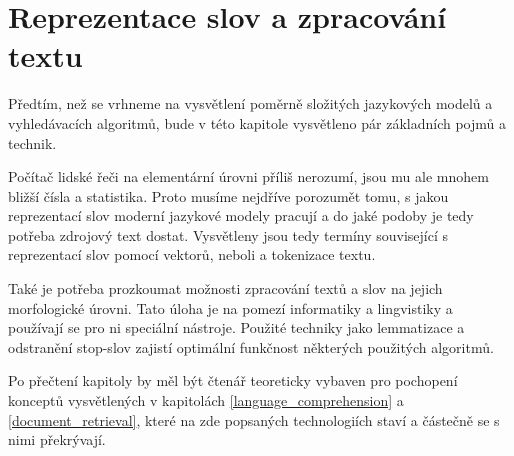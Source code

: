
\chapter{Reprezentace slov a zpracování textu}
\label{text_processing}

Předtím, než se vrhneme na vysvětlení poměrně složitých jazykových modelů a vyhledávacích algoritmů, bude v této kapitole vysvětleno pár základních pojmů a technik.\par 
Počítač lidské řeči na elementární úrovni příliš nerozumí, jsou mu ale mnohem bližší čísla a statistika. Proto musíme nejdříve porozumět tomu, s jakou reprezentací slov moderní jazykové modely pracují a do jaké podoby je tedy potřeba zdrojový text dostat. Vysvětleny jsou tedy termíny související s reprezentací slov pomocí vektorů, neboli  a tokenizace textu.\par 
Také je potřeba prozkoumat možnosti zpracování textů a slov na jejich morfologické úrovni. Tato úloha je na pomezí informatiky a lingvistiky a používají se pro ni speciální nástroje. Použité techniky jako lemmatizace a odstranění stop-slov zajistí optimální funkčnost některých použitých algoritmů.\par
Po přečtení kapitoly by měl být čtenář teoreticky vybaven pro pochopení konceptů vysvětlených v kapitolách \ref{language_comprehension} a \ref{document_retrieval}, které na zde popsaných technologiích staví a částečně se s nimi překrývají.

